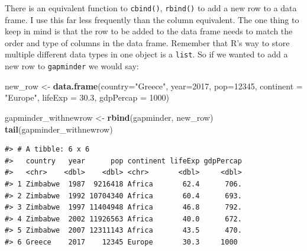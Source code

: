 \documentclass[
]{book}
\newenvironment{Shaded}{\begin{snugshade}}{\end{snugshade}}
\newcommand{\AttributeTok}[1]{\textcolor[rgb]{0.13,0.29,0.53}{#1}}
\newcommand{\CommentTok}[1]{\textcolor[rgb]{0.56,0.35,0.01}{\textit{#1}}}
\newcommand{\ConstantTok}[1]{\textcolor[rgb]{0.56,0.35,0.01}{#1}}
\newcommand{\DecValTok}[1]{\textcolor[rgb]{0.00,0.00,0.81}{#1}}
\newcommand{\FloatTok}[1]{\textcolor[rgb]{0.00,0.00,0.81}{#1}}
\newcommand{\FunctionTok}[1]{\textcolor[rgb]{0.13,0.29,0.53}{\textbf{#1}}}
\newcommand{\NormalTok}[1]{#1}
\newcommand{\OtherTok}[1]{\textcolor[rgb]{0.56,0.35,0.01}{#1}}
\newcommand{\SpecialCharTok}[1]{\textcolor[rgb]{0.81,0.36,0.00}{\textbf{#1}}}
\newcommand{\StringTok}[1]{\textcolor[rgb]{0.31,0.60,0.02}{#1}}
\begin{document}
\begin{Shaded}
\end{Shaded}

There is an equivalent function to \texttt{cbind()}, \texttt{rbind()} to add a new row to a data frame. I use this far less frequently than the column equivalent. The one thing to keep in mind is that the row to be added to the data frame needs to match the order and type of columns in the data frame. Remember that R's way to store multiple different data types in one object is a \texttt{list}. So if we wanted to add a new row to \texttt{gapminder} we would say:

\begin{Shaded}
\begin{Highlighting}[]
\NormalTok{new\_row }\OtherTok{\textless{}{-}} \FunctionTok{data.frame}\NormalTok{(}\AttributeTok{country=}\StringTok{"Greece"}\NormalTok{, }\AttributeTok{year=}\DecValTok{2017}\NormalTok{,}
                \AttributeTok{pop=}\DecValTok{12345}\NormalTok{, }\AttributeTok{continent =} \StringTok{"Europe"}\NormalTok{, }\AttributeTok{lifeExp =} \FloatTok{30.3}\NormalTok{,}
                \AttributeTok{gdpPercap =} \DecValTok{1000}\NormalTok{)}

\NormalTok{gapminder\_withnewrow }\OtherTok{\textless{}{-}} \FunctionTok{rbind}\NormalTok{(gapminder, new\_row)}
\FunctionTok{tail}\NormalTok{(gapminder\_withnewrow)}
\end{Highlighting}
\end{Shaded}

\begin{verbatim}
#> # A tibble: 6 x 6
#>   country   year      pop continent lifeExp gdpPercap
#>   <chr>    <dbl>    <dbl> <chr>       <dbl>     <dbl>
#> 1 Zimbabwe  1987  9216418 Africa       62.4      706.
#> 2 Zimbabwe  1992 10704340 Africa       60.4      693.
#> 3 Zimbabwe  1997 11404948 Africa       46.8      792.
#> 4 Zimbabwe  2002 11926563 Africa       40.0      672.
#> 5 Zimbabwe  2007 12311143 Africa       43.5      470.
#> 6 Greece    2017    12345 Europe       30.3     1000
\end{verbatim}
\end{document}
